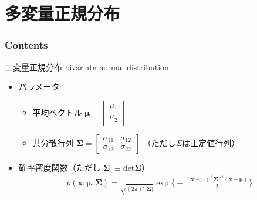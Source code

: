 \documentclass[aspectratio=169,unicode,dvipdfmx,14pt]{beamer}
\begin{document}

\section{多変量正規分布}

\begin{frame}\frametitle{Contents}
\Large \tableofcontents[currentsection]
\end{frame}

\begin{frame}{二変量正規分布 bivariate normal distribution}
\begin{itemize}
\item パラメータ
\begin{itemize}
\item 平均ベクトル
$\bm{\mu} = \begin{bmatrix} \mu_1 \\ \mu_2 \end{bmatrix}$
\item 共分散行列
$\bm{\Sigma} = \begin{bmatrix} \sigma_{11} & \sigma_{12} \\ \sigma_{12} & \sigma_{22} \end{bmatrix}$
（ただし$\Sigma$は正定値行列）
\end{itemize}
\item 確率密度関数（ただし$| \bm{\Sigma} | \equiv \mbox{det}\bm{\Sigma}$）
\begin{align}
p(\bm{x};\bm{\mu},\bm{\Sigma}) = \frac{1}{\sqrt{(2\pi)^2|\bm{\Sigma}|}}\exp\bigg\{ - \frac{(\bm{x} - \bm{\mu})^\intercal \bm{\Sigma}^{-1} (\bm{x} - \bm{\mu})}{2} \bigg\}
\end{align}
\end{itemize}
\end{frame}
\end{document}
